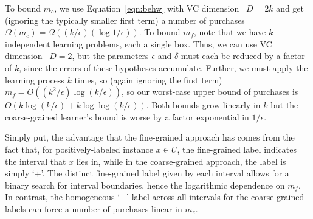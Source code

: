 
To bound $m_c$, we use Equation~\ref{eqn:behw} with
VC dimension~\cite{behw-lvd-89} $D=2k$
and get (ignoring
the typically smaller first term) a number of purchases
$\Omega(m_c)= \Omega ((k / \epsilon ) (\log 1/\epsilon))$.
To bound $m_f$, note that we have $k$ independent learning problems, each a
single box.  Thus, we can use VC dimension~\cite{behw-lvd-89} $D=2$,
but the parameters $\epsilon$ and $\delta$
must each be reduced by a factor of $k$, since the errors of these hypotheses
accumulate.  Further, we must apply the learning process $k$ times, so (again
ignoring the first term) $m_f=O((k^2/\epsilon) \log (k/\epsilon))$, so 
our worst-case upper bound of purchases is
$O(k \log (k/\epsilon) + k \log \log (k/\epsilon))$. Both bounds grow linearly in $k$ but the
coarse-grained learner's bound is worse by a factor  exponential in $1/\epsilon$.

Simply put, the advantage that the fine-grained approach has comes from
the fact that, for positively-labeled instance $x \in U$, the fine-grained
label indicates the interval that $x$ lies in, while in the coarse-grained
approach, the label is simply `$+$'.  The distinct fine-grained label 
given by each interval allows for a binary search for interval boundaries,
hence the logarithmic dependence on $m_f$. In contrast,
the homogeneous `$+$' label across all intervals
for the coarse-grained labels can force a number of purchases linear in $m_c$.


